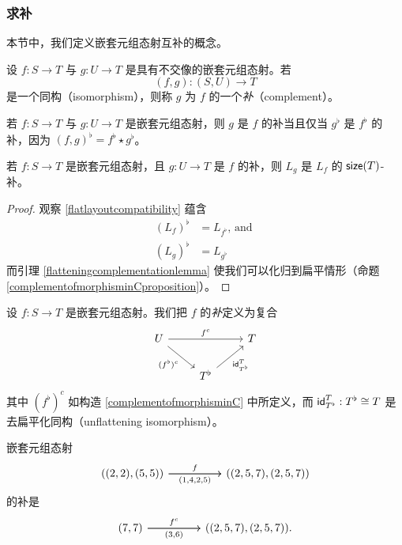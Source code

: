 \subsubsection{求补}

本节中，我们定义嵌套元组态射互补的概念。

\begin{definition} \label{definitionofcomplementarymorphismsinD}
设 $f:S \to T$ 与 $g:U \to T$ 是具有不交像的嵌套元组态射。若
\[
(f,g):(S,U) \to T
\]
是一个同构（isomorphism），则称 $g$ 为 $f$ 的一个{\it 补}（complement）。
\end{definition}

\begin{remark}若 $f:S \to T$ 与 $g:U \to T$ 是嵌套元组态射，则 $g$ 是 $f$ 的补当且仅当 $g^\flat$ 是 $f^\flat$ 的补，因为 $(f,g)^\flat = f^\flat \star g^\flat$。
\end{remark}




\begin{proposition}\label{complementofmorphisminDproposition}
    若 $f:S \to T$ 是嵌套元组态射，且 $g:U \to T$ 是 $f$ 的补，则 $L_{g}$ 是 $L_{f}$ 的 $\mathsf{size}(T)$-补。
\end{proposition}

\begin{proof}
    观察 \ref{flatlayoutcompatibility} 蕴含
    \begin{align*} (L_{f})^\flat & = L_{f^\flat}\text{, and }\\
    (L_{g})^\flat & = L_{g^\flat}
    \end{align*}
    而引理 \ref{flatteningcomplementationlemma} 使我们可以化归到扁平情形（命题 \ref{complementofmorphisminCproposition}）。
\end{proof}


\begin{construction}\label{complementofmorphisminD}
    设 $f:S \to T$ 是嵌套元组态射。我们把 $f$ 的{\it 补}定义为复合
    \[ \begin{tikzcd}
    U \ar[dr,swap,"(f^\flat)^c"] \ar[rr,"f^c"] & & T \\
    & T^\flat \ar[ur,swap,"\id_{T^\flat}^T"]
    \end{tikzcd} \]
    其中 $(f^\flat)^c$ 如构造 \ref{complementofmorphisminC} 中所定义，而 $\mathsf{id}_{T^\flat}^T:T^\flat \cong T$ 是去扁平化同构（unflattening isomorphism）。
\end{construction}

\begin{example}
    嵌套元组态射
    \[\begin{tikzcd} ((2,2),(5,5)) \ar[rr,"f"] \ar[rr,swap,"(1{,}4{,}2{,}5)"]& &  ((2,5,7),(2,5,7))\end{tikzcd} \]
    的补是
    \[\begin{tikzcd} (7,7) \ar[rr,"f^c"] \ar[rr,swap,"(3{,}6)"]& &  ((2,5,7),(2,5,7)).\end{tikzcd} \]
\end{example}

